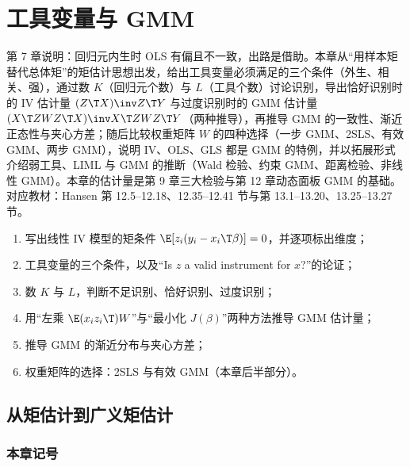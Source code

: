 \chapter{工具变量与 GMM}
\label{ch:U08a-ivgmm}

第 7 章说明：回归元内生时 OLS 有偏且不一致，出路是借助。本章从“用样本矩替代总体矩”的矩估计思想出发，给出工具变量必须满足的三个条件（外生、相关、强），通过数 $K$（回归元个数）与 $L$（工具个数）讨论识别，导出恰好识别时的 IV 估计量 $(Z\T X)\inv Z\T Y$ 与过度识别时的 GMM 估计量 $(X\T ZWZ\T X)\inv X\T ZWZ\T Y$（两种推导），再推导 GMM 的一致性、渐近正态性与夹心方差；随后比较权重矩阵 $W$ 的四种选择（一步 GMM、2SLS、有效 GMM、两步 GMM），说明 IV、OLS、GLS 都是 GMM 的特例，并以拓展形式介绍弱工具、LIML 与 GMM 的推断（Wald 检验、约束 GMM、距离检验、非线性 GMM）。本章的估计量是第 9 章三大检验与第 12 章动态面板 GMM 的基础。对应教材：Hansen 第 12.5--12.18、12.35--12.41 节与第 13.1--13.20、13.25--13.27 节。

\begin{keypt}[本章高频考点]
\begin{enumerate}
  \item 写出线性 IV 模型的矩条件 $\E[z_i(y_i-x_i\T\beta)]=0$，并逐项标出维度；
  \item 工具变量的三个条件，以及“Is $z$ a valid instrument for $x$?”的论证；
  \item 数 $K$ 与 $L$，判断不足识别、恰好识别、过度识别；
  \item 用“左乘 $\E(x_iz_i\T)W$”与“最小化 $J(\beta)$”两种方法推导 GMM 估计量；
  \item 推导 GMM 的渐近分布与夹心方差；
  \item 权重矩阵的选择：2SLS 与有效 GMM（本章后半部分）。
\end{enumerate}
\end{keypt}

\section{从矩估计到广义矩估计}\label{sec:U08a-mm}

\subsection{本章记号}

